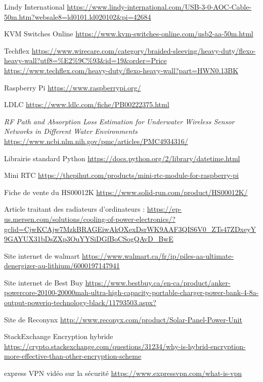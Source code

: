 \begin{thebibliographyUL}{9}
 Lindy International \url{https://www.lindy-international.com/USB-3-0-AOC-Cable-50m.htm?websale8=ld0101.ld020102&pi=42684}

 KVM Switches Online \url{https://www.kvm-switches-online.com/usb2-aa-50m.html}

 Techflex \url{https://www.wirecare.com/category/braided-sleeving/heavy-duty/flexo-heavy-wall?utf8=\%E2\%9C\%93&id=19&order=Price} \url{https://www.techflex.com/heavy-duty/flexo-heavy-wall?part=HWN0.13BK}

 Raspberry Pi \url{https://www.raspberrypi.org/}

 LDLC \url{https://www.ldlc.com/fiche/PB00222375.html}

 \emph{RF Path and Absorption Loss Estimation for Underwater Wireless Sensor Networks in Different Water Environments} \url{https://www.ncbi.nlm.nih.gov/pmc/articles/PMC4934316/}

 Librairie standard Python \url{https://docs.python.org/2/library/datetime.html}


 Mini RTC \url{https://thepihut.com/products/mini-rtc-module-for-raspberry-pi}

 Fiche de vente du HS00012K
\url{https://www.solid-run.com/product/HS00012K/}

 Article traitant des radiateurs d'ordinateurs :
\url{https://ep-us.mersen.com/solutions/cooling-of-power-electronics/?gclid=CjwKCAjw7MzkBRAGEiwAkOXexDsrWK9AAF3QIS6V0_ZTs47ZDxeyY9GAYUX31bDsZXp3OuYYSiDGfBoCSogQAvD_BwE}

 Site internet de walmart 
\url{https://www.walmart.ca/fr/ip/piles-aa-ultimate-denergizer-au-lithium/6000197147941}

  Site internet de  Best Buy
\url{https://www.bestbuy.ca/en-ca/product/anker-powercore-20100-20000mah-ultra-high-capacity-portable-charger-power-bank-4-8a-output-poweriq-technology-black/11793503.aspx?}

  Site de Reconynx
\url{http://www.reconyx.com/product/Solar-Panel-Power-Unit}

  StackExchange Encryption hybride
\url{https://crypto.stackexchange.com/questions/31234/why-is-hybrid-encryption-more-effective-than-other-encryption-scheme}

  express VPN vidéo sur la sécurité
\url{https://www.expressvpn.com/what-is-vpn}


\end{thebibliographyUL}
